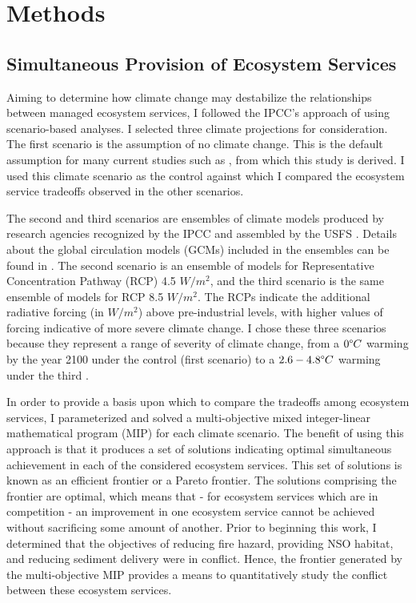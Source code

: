 \section{Methods}
\subsection{Simultaneous Provision of Ecosystem Services}
\label{subsec:whyUsingMultiObjModel}
Aiming to determine how climate change may destabilize the relationships between managed ecosystem services, I followed the IPCC's approach of using scenario-based analyses. I selected three climate projections for consideration. The first scenario is the assumption of no climate change. This is the default assumption for many current studies such as \cite{svetlanaDissertation2013}, from which this study is derived. I used this climate scenario as the control against which I  compared the ecosystem service tradeoffs observed in the other scenarios.

The second and third scenarios are ensembles of climate models produced by research agencies recognized by the IPCC and assembled by the USFS \cite{dixon2002essential}. Details about the global circulation models (GCMs) included in the ensembles can be found in \cite{ClimateModelsInFVSEnsemble}. The second scenario is an ensemble of models for Representative Concentration Pathway (RCP) 4.5 $W/m^2$, and the third scenario is the same ensemble of models for RCP 8.5 $W/m^2$. The RCPs indicate the additional radiative forcing (in $W/m^2$) above pre-industrial levels, with higher values of forcing indicative of more severe climate change. I chose these three scenarios because they represent a range of severity of climate change, from a $0 \degree C$ warming by the year 2100 under the control (first scenario) to a $2.6-4.8 \degree C$ warming under the third \cite{ipcc2013climate}.

In order to provide a basis upon which to compare the tradeoffs among ecosystem services, I parameterized and solved a multi-objective mixed integer-linear mathematical program (MIP) for each climate scenario. The benefit of using this approach is that it produces a set of solutions indicating optimal simultaneous achievement in each of the considered ecosystem services. This set of solutions is known as an efficient frontier or a Pareto frontier. The solutions comprising the frontier are optimal, which means that - for ecosystem services which are in competition - an improvement in one ecosystem service cannot be achieved without sacrificing some amount of another. Prior to beginning this work, I determined that the objectives of reducing fire hazard, providing NSO habitat, and reducing sediment delivery were in conflict. Hence, the frontier generated by the multi-objective MIP provides a means to quantitatively study the conflict between these ecosystem services.

